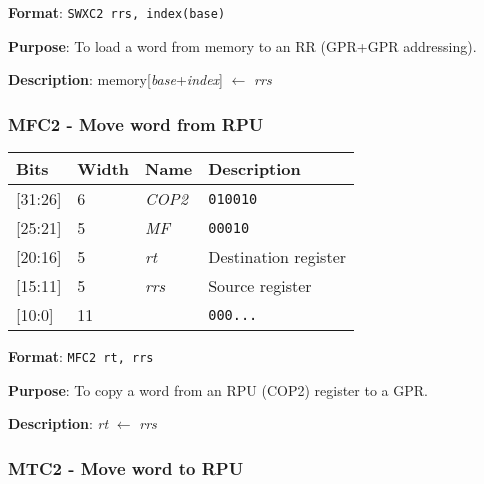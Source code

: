 \documentclass[11pt]{article}
\begin{document}
\textbf{Format}: \texttt{SWXC2 rrs, index(base)}

\textbf{Purpose}: To load a word from memory to an RR (GPR+GPR addressing).

\textbf{Description}: memory[\emph{base}+\emph{index}] $\leftarrow$ \emph{rrs}

\text{}
\subsubsection{MFC2 - Move word from RPU}
\text{}

\begin{table}[H] \centering
  \def\arraystretch{1.4}
  \begin{tabular}{|m{2cm}|m{1.5cm}|m{2.5cm}|m{4.5cm}|}
    \hline
    \textbf{Bits} & \textbf{Width} & \textbf{Name} & \textbf{Description}\\ \hline

    [31:26] & 6 & \emph{COP2} & \texttt{010010}\\ \hline

    [25:21] & 5 & \emph{MF} & \texttt{00010}\\ \hline

    [20:16] & 5 & \emph{rt} & Destination register\\ \hline

    [15:11] & 5 & \emph{rrs} & Source register\\ \hline

    [10:0] & 11 & & \texttt{000...}\\ \hline
  \end{tabular}
\end{table}

\textbf{Format}: \texttt{MFC2 rt, rrs}

\textbf{Purpose}: To copy a word from an RPU (COP2) register to a GPR.

\textbf{Description}: \emph{rt} $\leftarrow$ \emph{rrs}

\text{}
\subsubsection{MTC2 - Move word to RPU}
\text{}
\end{document}
